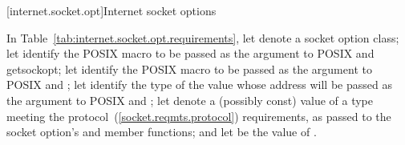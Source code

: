 [internet.socket.opt]{Internet socket options}

\pnum
In Table~\ref{tab:internet.socket.opt.requirements}, let  denote a socket option class; let  identify the POSIX macro to be passed as the  argument to POSIX  and getsockopt; let  identify the POSIX macro to be passed as the  argument to POSIX  and ; let  identify the type of the value whose address will be passed as the  argument to POSIX  and ; let  denote a (possibly const) value of a type meeting the protocol~(\ref{socket.reqmts.protocol}) requirements, as passed to the socket option's  and  member functions; and let  be the value of .

